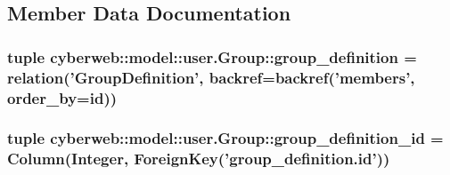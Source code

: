 \subsection{\-Member \-Data \-Documentation}
\hypertarget{classcyberweb_1_1model_1_1user_1_1_group_a2622971c54024796c9b838db8af0c305}{
\subsubsection[{group\-\_\-definition}]{\setlength{\rightskip}{0pt plus 5cm}tuple {\bf cyberweb\-::model\-::user.\-Group\-::group\-\_\-definition} = relation('{\bf \-Group\-Definition}', backref=backref('members', order\-\_\-by={\bf id}))}}\label{classcyberweb_1_1model_1_1user_1_1_group_a2622971c54024796c9b838db8af0c305}
\hypertarget{classcyberweb_1_1model_1_1user_1_1_group_a39de1ba0e8c26d8c6a108f14b86cdd14}{
\subsubsection[{group\-\_\-definition\-\_\-id}]{\setlength{\rightskip}{0pt plus 5cm}tuple {\bf cyberweb\-::model\-::user.\-Group\-::group\-\_\-definition\-\_\-id} = \-Column(\-Integer, \-Foreign\-Key('group\-\_\-definition.\-id'))}}\label{classcyberweb_1_1model_1_1user_1_1_group_a39de1ba0e8c26d8c6a108f14b86cdd14}
\hypertarget{classcyberweb_1_1model_1_1user_1_1_group_a19fa4782728159211e1f30928dff2b04}{
\subsubsection[{group\-\_\-id}]{}}\label{classcyberweb_1_1model_1_1user_1_1_group_a19fa4782728159211e1f30928dff2b04}
